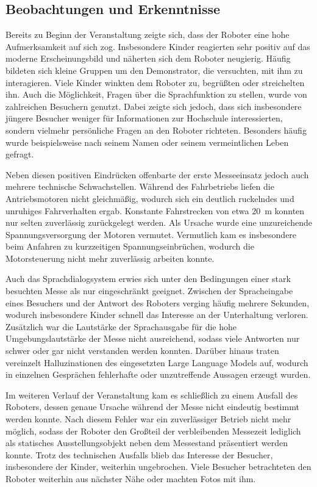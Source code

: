 \subsection*{Beobachtungen und Erkenntnisse}

Bereits zu Beginn der Veranstaltung zeigte sich, dass der Roboter eine hohe Aufmerksamkeit auf sich zog. Insbesondere Kinder reagierten sehr positiv auf das moderne Erscheinungsbild und näherten sich dem Roboter neugierig. Häufig bildeten sich kleine Gruppen um den Demonstrator, die versuchten, mit ihm zu interagieren. Viele Kinder winkten dem Roboter zu, begrüßten oder streichelten ihn. Auch die Möglichkeit, Fragen über die Sprachfunktion zu stellen, wurde von zahlreichen Besuchern genutzt. Dabei zeigte sich jedoch, dass sich insbesondere jüngere Besucher weniger für Informationen zur Hochschule interessierten, sondern vielmehr persönliche Fragen an den Roboter richteten. Besonders häufig wurde beispielsweise nach seinem Namen oder seinem vermeintlichen Leben gefragt.

Neben diesen positiven Eindrücken offenbarte der erste Messeeinsatz jedoch auch mehrere technische Schwachstellen. Während des Fahrbetriebs liefen die Antriebsmotoren nicht gleichmäßig, wodurch sich ein deutlich ruckelndes und unruhiges Fahrverhalten ergab. Konstante Fahrstrecken von etwa \SI{20}{\meter} konnten nur selten zuverlässig zurückgelegt werden. Als Ursache wurde eine unzureichende Spannungsversorgung der Motoren vermutet. Vermutlich kam es insbesondere beim Anfahren zu kurzzeitigen Spannungseinbrüchen, wodurch die Motorsteuerung nicht mehr zuverlässig arbeiten konnte.

Auch das Sprachdialogsystem erwies sich unter den Bedingungen einer stark besuchten Messe als nur eingeschränkt geeignet. Zwischen der Spracheingabe eines Besuchers und der Antwort des Roboters verging häufig mehrere Sekunden, wodurch insbesondere Kinder schnell das Interesse an der Unterhaltung verloren. Zusätzlich war die Lautstärke der Sprachausgabe für die hohe Umgebungslautstärke der Messe nicht ausreichend, sodass viele Antworten nur schwer oder gar nicht verstanden werden konnten. Darüber hinaus traten vereinzelt Halluzinationen des eingesetzten Large Language Models auf, wodurch in einzelnen Gesprächen fehlerhafte oder unzutreffende Aussagen erzeugt wurden.

Im weiteren Verlauf der Veranstaltung kam es schließlich zu einem Ausfall des Roboters, dessen genaue Ursache während der Messe nicht eindeutig bestimmt werden konnte. Nach diesem Fehler war ein zuverlässiger Betrieb nicht mehr möglich, sodass der Roboter den Großteil der verbleibenden Messezeit lediglich als statisches Ausstellungsobjekt neben dem Messestand präsentiert werden konnte. Trotz des technischen Ausfalls blieb das Interesse der Besucher, insbesondere der Kinder, weiterhin ungebrochen. Viele Besucher betrachteten den Roboter weiterhin aus nächster Nähe oder machten Fotos mit ihm.

